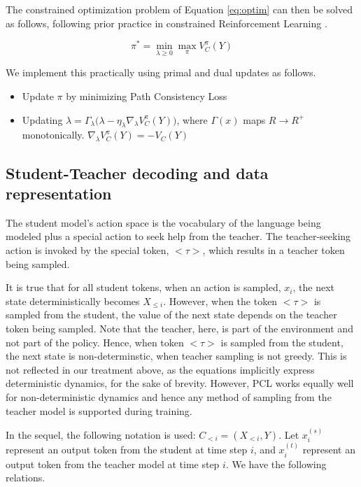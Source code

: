 The constrained optimization problem of Equation \ref{eq:optim} can then be solved as follows, following prior practice in constrained Reinforcement Learning \cite{tessler2018reward} \cite{borkar2005actor}.

\begin{equation}
    \pi^* = \min_{\lambda \geq 0} \max_{\pi} V_C^{\pi}(Y)
\end{equation}

We implement this practically using primal and dual updates as follows.
\begin{itemize}
    \item Update $\pi$ by minimizing Path Consistency Loss
    \item Updating $\lambda = \Gamma_{\lambda}\Big(\lambda - \eta_{\lambda} \nabla_{\lambda} V_C^{\pi}(Y) \Big)$, where $\Gamma(x)$ maps $R \rightarrow R^+$ monotonically. $\nabla_{\lambda} V_C^{\pi}(Y) = -V_C(Y)$
\end{itemize}

\subsection{Student-Teacher decoding and data representation}

The student model's action space is the vocabulary of the language being modeled plus a special action to seek help from the teacher. The teacher-seeking action is invoked by the special token, $<\tau>$, which results in a teacher token being sampled.

It is true that for all student tokens, when an action is sampled, $x_i$, the next state deterministically becomes $X_{\leq i}$. However, when the token $<\tau>$ is sampled from the student, the value of the next state depends on the teacher token being sampled. Note that the teacher, here, is part of the environment and not part of the policy. Hence, when token $<\tau>$ is sampled from the student, the next state is non-determinstic, when teacher sampling is not greedy. This is not reflected in our treatment above, as the equations implicitly express deterministic dynamics, for the sake of brevity. However, PCL works equally well for non-deterministic dynamics and hence any method of sampling from the teacher model is supported during training.

In the sequel, the following notation is used: $C_{<i} = (X_{<i}, Y)$. Let $x_{i}^{(s)}$ represent an output token from the student at time step $i$, and $x_{i}^{(t)}$ represent an output token from the teacher model at time step $i$. We have the following relations.


